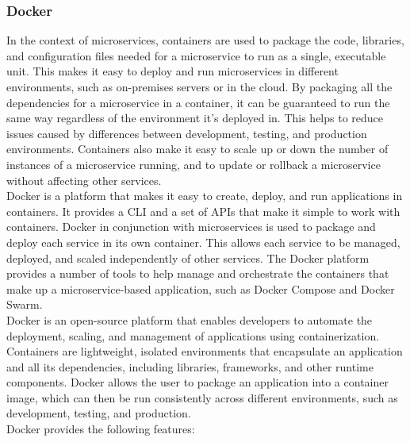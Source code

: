 \subsubsection{Docker}
In the context of microservices, containers are used to package the code, libraries, and configuration files needed for a microservice to run as a single, executable unit. This makes it easy to deploy and run microservices in different environments, such as on-premises servers or in the cloud. By packaging all the dependencies for a microservice in a container, it can be guaranteed to run the same way regardless of the environment it's deployed in. This helps to reduce issues caused by differences between development, testing, and production environments. Containers also make it easy to scale up or down the number of instances of a microservice running, and to update or rollback a microservice without affecting other services.\vspace{5mm} \\
Docker is a platform that makes it easy to create, deploy, and run applications in containers. It provides a \ac{CLI} and a set of \acp{API} that make it simple to work with containers. Docker in conjunction with microservices is used to package and deploy each service in its own container. This allows each service to be managed, deployed, and scaled independently of other services. The Docker platform provides a number of tools to help manage and orchestrate the containers that make up a microservice-based application, such as Docker Compose and Docker Swarm.\vspace{5mm} \\
Docker is an open-source platform that enables developers to automate the deployment, scaling, and management of applications using containerization. Containers are lightweight, isolated environments that encapsulate an application and all its dependencies, including libraries, frameworks, and other runtime components. Docker allows the user to package an application into a container image, which can then be run consistently across different environments, such as development, testing, and production.\vspace{5mm} \\
Docker provides the following features:
